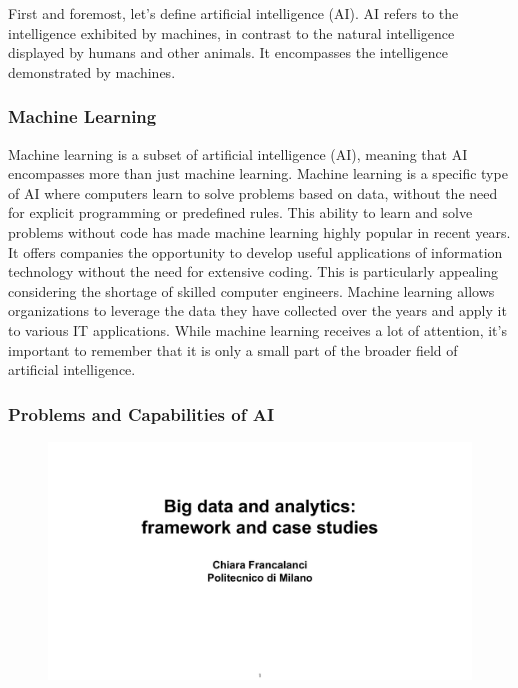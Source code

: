 First and foremost, let's define artificial intelligence (AI). AI refers
to the intelligence exhibited by machines, in contrast to the natural
intelligence displayed by humans and other animals. It encompasses the
intelligence demonstrated by machines.


\subsubsection{Machine Learning}\label{machine-learning}

Machine learning is a subset of artificial intelligence (AI), meaning
that AI encompasses more than just machine learning. Machine learning is
a specific type of AI where computers learn to solve problems based on
data, without the need for explicit programming or predefined rules.
This ability to learn and solve problems without code has made machine
learning highly popular in recent years. It offers companies the
opportunity to develop useful applications of information technology
without the need for extensive coding. This is particularly appealing
considering the shortage of skilled computer engineers. Machine learning
allows organizations to leverage the data they have collected over the
years and apply it to various IT applications. While machine learning
receives a lot of attention, it's important to remember that it is only
a small part of the broader field of artificial intelligence.


\subsubsection{Problems and Capabilities of
    AI}\label{problems-and-capabilities-of-ai}

\begin{figure}[!h]
    \centering
    \includegraphics[page=5, trim = 1.5cm 3cm 1.5cm 4cm, clip, width=\textwidth]{images/06 - BIG_DATA.pdf}
\end{figure}

